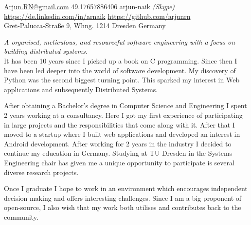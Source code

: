 \documentclass[10pt,a4paper]{article}
\begin{document}
\sloppy  %


\nobreakvspace{0.3em}  %

\noindent\href{mailto:Arjun.RN@gmail.com}{Arjun.RN\mbox{}@\mbox{}gmail.com}\sbull
\textsmaller{+}49.17657886406
\sbull arjun-naik \emph{(Skype)}
\\
\sbull
\href{https://de.linkedin.com/in/arnaik}{https://de.linkedin.com/in/arnaik}
\sbull
\href{https://github.com/arjunrn}{https://github.com/arjunrn}
\\
Gret-Palucca-Stra{\ss}e 9, Whng. 1214\sbull
Dresden\sbull
Germany

\spacedhrule{0.9em}{-0.4em}  %


\vspace{-1.3em}  %
\begin{multicols}{2}  %
\noindent \emph{A organised, meticulous, and resourceful software engineering with a focus on building distributed systems.}
\\
It has been 10 years since I picked up a book on C programming. Since then I have been led deeper into the world of software development. My discovery of Python was the second biggest turning point. This sparked my interest in Web applications and subsequently Distributed Systems. 

After obtaining a Bachelor's degree in Computer Science and Engineering I spent 2 years working at a consultancy. Here I got my first experience of participating in large projects and the responsibilities that come along with it. After that I moved to a startup where I built web applications and developed an interest in Android development. After working for 2 years in the industry I decided to continue my education in Germany. Studying at TU Dresden in the Systems Engineering chair has given me a unique opportunity to participate is several diverse research projects.

Once I graduate I hope to work in an environment which encourages independent decision making and offers interesting challenges. Since I am a big proponent of open-source, I also wish that my work both utilises and contributes back to the community.

\end{multicols}
\end{document}
